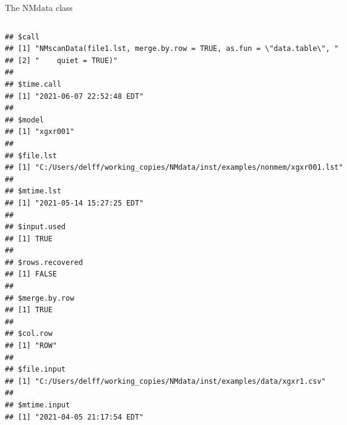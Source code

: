 \documentclass[
  8pt,
  ignorenonframetext,
  aspectratio=169]{beamer}
\begin{document}
\begin{frame}[fragile]{The NMdata class}
\begin{columns}[T]
\begin{column}{0.48\textwidth}
\begin{verbatim}
## $call
## [1] "NMscanData(file1.lst, merge.by.row = TRUE, as.fun = \"data.table\", "
## [2] "    quiet = TRUE)"                                                   
## 
## $time.call
## [1] "2021-06-07 22:52:48 EDT"
## 
## $model
## [1] "xgxr001"
## 
## $file.lst
## [1] "C:/Users/delff/working_copies/NMdata/inst/examples/nonmem/xgxr001.lst"
## 
## $mtime.lst
## [1] "2021-05-14 15:27:25 EDT"
## 
## $input.used
## [1] TRUE
## 
## $rows.recovered
## [1] FALSE
## 
## $merge.by.row
## [1] TRUE
## 
## $col.row
## [1] "ROW"
## 
## $file.input
## [1] "C:/Users/delff/working_copies/NMdata/inst/examples/data/xgxr1.csv"
## 
## $mtime.input
## [1] "2021-04-05 21:17:54 EDT"
\end{verbatim}
\end{column}
\end{columns}
\end{frame}
\end{document}
